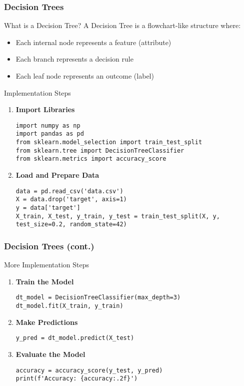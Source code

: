 \documentclass[aspectratio=169]{beamer}
\begin{document}
\begin{frame}[fragile]
    \frametitle{Decision Trees}
    \begin{block}{What is a Decision Tree?}
        A Decision Tree is a flowchart-like structure where:
        \begin{itemize}
            \item Each internal node represents a feature (attribute)
            \item Each branch represents a decision rule
            \item Each leaf node represents an outcome (label)
        \end{itemize}
    \end{block}

    \begin{block}{Implementation Steps}
        \begin{enumerate}
            \item \textbf{Import Libraries}
            \begin{lstlisting}
import numpy as np
import pandas as pd
from sklearn.model_selection import train_test_split
from sklearn.tree import DecisionTreeClassifier
from sklearn.metrics import accuracy_score
            \end{lstlisting}

            \item \textbf{Load and Prepare Data}
            \begin{lstlisting}
data = pd.read_csv('data.csv')
X = data.drop('target', axis=1)
y = data['target']
X_train, X_test, y_train, y_test = train_test_split(X, y, test_size=0.2, random_state=42)
            \end{lstlisting}
        \end{enumerate}
    \end{block}
\end{frame}

\begin{frame}[fragile]
    \frametitle{Decision Trees (cont.)}
    \begin{block}{More Implementation Steps}
        \begin{enumerate}[resume]
            \item \textbf{Train the Model}
            \begin{lstlisting}
dt_model = DecisionTreeClassifier(max_depth=3)
dt_model.fit(X_train, y_train)
            \end{lstlisting}

            \item \textbf{Make Predictions}
            \begin{lstlisting}
y_pred = dt_model.predict(X_test)
            \end{lstlisting}

            \item \textbf{Evaluate the Model}
            \begin{lstlisting}
accuracy = accuracy_score(y_test, y_pred)
print(f'Accuracy: {accuracy:.2f}')
            \end{lstlisting}
        \end{enumerate}
    \end{block}
\end{frame}
\end{document}
